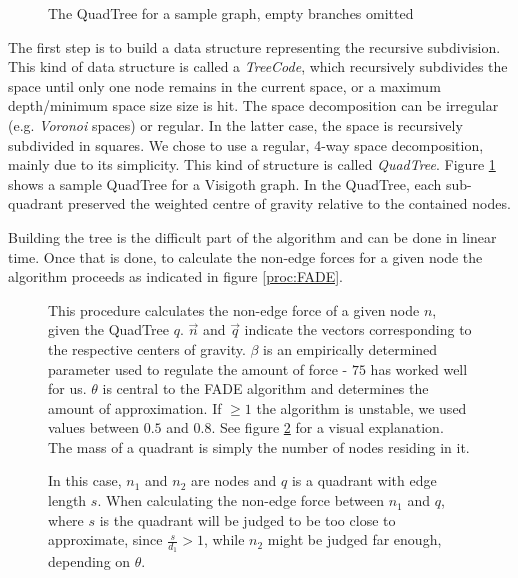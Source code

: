 \documentclass[a4paper,11pt,titlepage]{article}
\begin{document}
\begin{figure}
  \centering
  \hspace{10pt}
  \caption{The QuadTree for a sample graph, empty branches omitted}
  \label{fig:quadtree}
\end{figure}

The first step is to build a data structure representing the recursive
subdivision. This kind of data structure is called a \emph{TreeCode},
which recursively subdivides the space until only one node remains in
the current space, or a maximum depth/minimum space size size is
hit. The space decomposition can be irregular (e.g. \emph{Voronoi}
spaces) or regular. In the latter case, the space is recursively
subdivided in squares. We chose to use a regular, 4-way space
decomposition, mainly due to its simplicity. This kind of structure is
called \emph{QuadTree}. Figure \ref{fig:quadtree} shows a sample
QuadTree for a Visigoth graph. In the QuadTree, each sub-quadrant
preserved the weighted centre of gravity relative to the contained
nodes.

Building the tree is the difficult part of the algorithm and can be
done in linear time. Once that is done, to calculate the non-edge
forces for a given node the algorithm proceeds as indicated in figure
\ref{proc:FADE}.

\begin{figure}[ht]
  \begin{minipage}[b]{0.5\linewidth}
    
    \caption{This procedure calculates the non-edge force of a given
      node \(n\), given the QuadTree \(q\). \(\vec{n}\) and
      \(\vec{q}\) indicate the vectors corresponding to the respective
      centers of gravity. \(\beta\) is an empirically determined
      parameter used to regulate the amount of force - \(75\) has
      worked well for us. \(\theta\) is central to the FADE algorithm
      and determines the amount of approximation. If \(\geq 1\) the
      algorithm is unstable, we used values between \(0.5\) and
      \(0.8\). See figure \ref{fig:theta} for a visual
      explanation. The mass of a quadrant is simply the number of
      nodes residing in it. }
    \label{proc:FADE}
  \end{minipage}
  \hspace{10pt}
  \begin{minipage}[b]{0.5\linewidth}
    \centering
    
    \caption{In this case, \(n_1\) and \(n_2\) are nodes and \(q\) is
      a quadrant with edge length \(s\). When calculating the non-edge
      force between \(n_1\) and \(q\), where \(s\) is the quadrant
      will be judged to be too close to approximate, since
      \(\frac{s}{d_1} > 1\), while \(n_2\) might be judged far enough,
      depending on \(\theta\).}
    \label{fig:theta}
  \end{minipage}
\end{figure}
\end{document}
